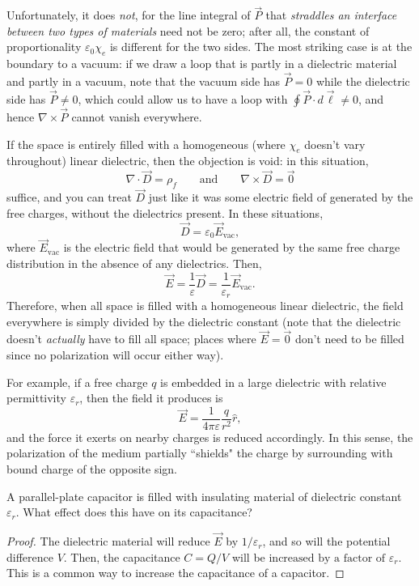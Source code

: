Unfortunately, it does \textit{not}, for the line integral of $\vec{P}$ that \textit{straddles an interface between two types of materials} need not be zero; after all, the constant of proportionality $\varepsilon_0\chi_e$ is different for the two sides. The most striking case is at the boundary to a vacuum: if we draw a loop that is partly in a dielectric material and partly in a vacuum, note that the vacuum side has $\vec{P}=0$ while the dielectric side has $\vec{P}\neq 0$, which could allow us to have a loop with $\oint \vec{P}\cdot d\vec{\ell}\neq 0$, and hence $\nabla\times\vec{P}$ cannot vanish everywhere.

If the space is entirely filled with a homogeneous (where $\chi_e$ doesn't vary throughout) linear dielectric, then the objection is void: in this situation,
\[\nabla\cdot \vec{D}=\rho_f\qquad\text{and}\qquad\nabla\times\vec{D}=\vec{0}\]
suffice, and you can treat $\vec{D}$ just like it was some electric field of generated by the free charges, without the dielectrics present. In these situations,
\[\vec{D}=\varepsilon_0\vec{E}_{\text{vac}},\]
where $\vec{E}_{\text{vac}}$ is the electric field that would be generated by the same free charge distribution in the absence of any dielectrics. Then,
\[\vec{E}=\frac{1}{\varepsilon}\vec{D}=\frac{1}{\varepsilon_r}\vec{E}_{\text{vac}}.\]
Therefore, when all space is filled with a homogeneous linear dielectric, the field everywhere is simply divided by the dielectric constant (note that the dielectric doesn't \textit{actually} have to fill all space; places where $\vec{E}=\vec{0}$ don't need to be filled since no polarization will occur either way).

For example, if a free charge $q$ is embedded in a large dielectric with relative permittivity $\varepsilon_r$, then the field it produces is
\[\vec{E}=\frac{1}{4\pi\varepsilon}\frac{q}{r^2}\hat{r},\]
and the force it exerts on nearby charges is reduced accordingly. In this sense, the polarization of the medium partially ``shields" the charge by surrounding with bound charge of the opposite sign.

\begin{example}
A parallel-plate capacitor is filled with insulating material of dielectric constant $\varepsilon_r$. What effect does this have on its capacitance?
\end{example}

\begin{proof}
The dielectric material will reduce $\vec{E}$ by $1/\varepsilon_r$, and so will the potential difference $V$. Then, the capacitance $C=Q/V$ will be $\boxed{\text{increased by a factor of }\varepsilon_r}$. This is a common way to increase the capacitance of a capacitor.
\end{proof}

